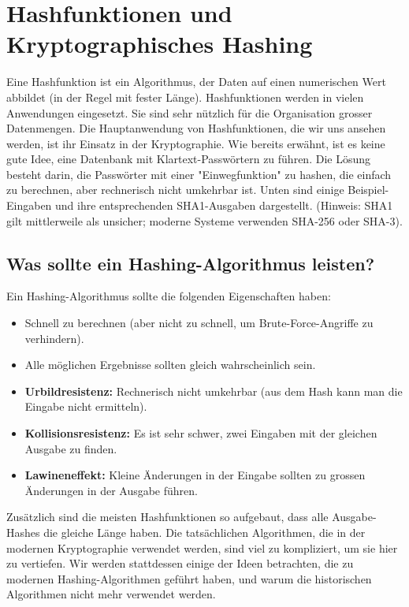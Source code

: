 \documentclass[11pt,a4paper]{report}
\begin{document}
\setcounter{section}{6}
\section{Hashfunktionen und Kryptographisches Hashing}

Eine Hashfunktion ist ein Algorithmus, der Daten auf einen numerischen Wert abbildet (in der Regel mit fester Länge).
Hashfunktionen werden in vielen Anwendungen eingesetzt. Sie sind sehr nützlich für die Organisation grosser Datenmengen.
Die Hauptanwendung von Hashfunktionen, die wir uns ansehen werden, ist ihr Einsatz in der Kryptographie.
Wie bereits erwähnt, ist es keine gute Idee, eine Datenbank mit Klartext-Passwörtern zu führen.
Die Lösung besteht darin, die Passwörter mit einer "Einwegfunktion" zu hashen, die einfach zu berechnen, aber rechnerisch nicht umkehrbar ist.
Unten sind einige Beispiel-Eingaben und ihre entsprechenden SHA1-Ausgaben dargestellt. (Hinweis: SHA1 gilt mittlerweile als unsicher; moderne Systeme verwenden SHA-256 oder SHA-3).

\subsection{Was sollte ein Hashing-Algorithmus leisten?}

Ein Hashing-Algorithmus sollte die folgenden Eigenschaften haben:
\begin{itemize}
\item Schnell zu berechnen (aber nicht zu schnell, um Brute-Force-Angriffe zu verhindern).
\item Alle möglichen Ergebnisse sollten gleich wahrscheinlich sein.
\item \textbf{Urbildresistenz:} Rechnerisch nicht umkehrbar (aus dem Hash kann man die Eingabe nicht ermitteln).
\item \textbf{Kollisionsresistenz:} Es ist sehr schwer, zwei Eingaben mit der gleichen Ausgabe zu finden.
\item \textbf{Lawineneffekt:} Kleine Änderungen in der Eingabe sollten zu grossen Änderungen in der Ausgabe führen.
\end{itemize}

Zusätzlich sind die meisten Hashfunktionen so aufgebaut, dass alle Ausgabe-Hashes die gleiche Länge haben.
Die tatsächlichen Algorithmen, die in der modernen Kryptographie verwendet werden, sind viel zu kompliziert, um sie hier zu vertiefen.
Wir werden stattdessen einige der Ideen betrachten, die zu modernen Hashing-Algorithmen geführt haben, und warum die historischen Algorithmen nicht mehr verwendet werden.
\end{document}
